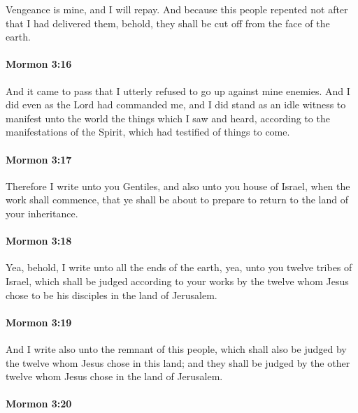 			Vengeance is mine, and I will repay.
			And because this people repented not after that I had delivered them,
			behold, they shall be cut off from the face of the earth.

		\paragraph{Mormon 3:16} %
			\label{MORMON-3-16}

			And it came to pass that I utterly refused to go up against mine enemies.
			And I did even as the Lord had commanded me,
			and I did stand as an idle witness
			to manifest unto the world the things which I saw and heard,
			according to the manifestations of the Spirit,
			which had testified of things to come.

		\paragraph{Mormon 3:17} %
			\label{MORMON-3-17}

			Therefore I write unto you Gentiles,
			and also unto you house of Israel,
			when the work shall commence,
			that ye shall be about to prepare to return to the land of your inheritance.

		\paragraph{Mormon 3:18} %
			\label{MORMON-3-18}

			Yea, behold, I write unto all the ends of the earth,
			yea, unto you twelve tribes of Israel,
			which shall be judged according to your works by the twelve
			whom Jesus chose to be his disciples in the land of Jerusalem.

		\paragraph{Mormon 3:19} %
			\label{MORMON-3-19}

			And I write also unto the remnant of this people,
			which shall also be judged by the twelve whom Jesus chose in this land;
			and they shall be judged by the other twelve
			whom Jesus chose in the land of Jerusalem.

		\paragraph{Mormon 3:20}
			\label{MORMON-3-20}

